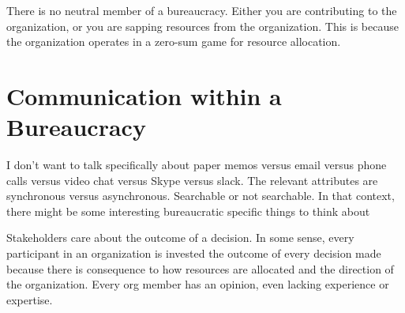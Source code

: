 \documentclass{book}
\begin{document}
    There is no neutral member of a bureaucracy. Either you are contributing to the organization, or you are sapping resources from the organization. This is because the organization operates in a zero-sum game for resource allocation.
    
    
    
    
  \newpage
    
    
    
    
        
  
  \newpage
  
    
    
    
  \newpage
  \section{Communication within a Bureaucracy}
  I don't want to talk specifically about paper memos versus email versus phone calls versus video chat versus Skype versus slack. 
The relevant attributes are synchronous versus asynchronous. Searchable or not searchable. In that context, there might be some interesting bureaucratic specific things to think about
    
    
    
    
    
    

    Stakeholders care about the outcome of a decision. 
    In some sense, every participant in an organization is invested the outcome of every decision made because there is consequence to how resources are allocated and the direction of the organization. Every org member has an opinion, even lacking experience or expertise. 
    
    
    
%    
%    
    
\end{document}
